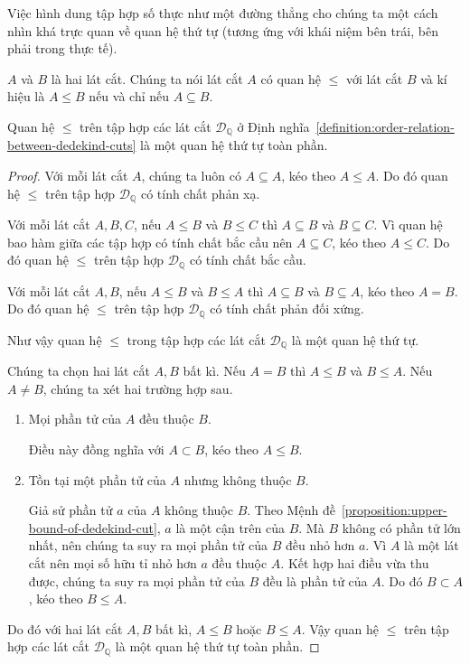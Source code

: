 Việc hình dung tập hợp số thực như một đường thẳng cho chúng ta một cách nhìn khá trực quan về quan hệ thứ tự (tương ứng với khái niệm bên trái, bên phải trong thực tế).

\begin{definition}\label{definition:order-relation-between-dedekind-cuts}
    $A$ và $B$ là hai lát cắt. Chúng ta nói lát cắt $A$ có quan hệ $\leq$ với lát cắt $B$ và kí hiệu là $A\leq B$ nếu và chỉ nếu $A\subseteq B$.
\end{definition}

\begin{theorem}
    Quan hệ $\leq$ trên tập hợp các lát cắt $\mathscr{D}_{\mathbb{Q}}$ ở Định nghĩa~\ref{definition:order-relation-between-dedekind-cuts} là một quan hệ thứ tự toàn phần.
\end{theorem}

\begin{proof}
    Với mỗi lát cắt $A$, chúng ta luôn có $A\subseteq A$, kéo theo $A\leq A$. Do đó quan hệ $\leq$ trên tập hợp $\mathscr{D}_{\mathbb{Q}}$ có tính chất phản xạ.

    Với mỗi lát cắt $A, B, C$, nếu $A\leq B$ và $B\leq C$ thì $A\subseteq B$ và $B\subseteq C$. Vì quan hệ bao hàm giữa các tập hợp có tính chất bắc cầu nên $A\subseteq C$, kéo theo $A\leq C$. Do đó quan hệ $\leq$ trên tập hợp $\mathscr{D}_{\mathbb{Q}}$ có tính chất bắc cầu.

    Với mỗi lát cắt $A, B$, nếu $A\leq B$ và $B\leq A$ thì $A\subseteq B$ và $B\subseteq A$, kéo theo $A = B$. Do đó quan hệ $\leq$ trên tập hợp $\mathscr{D}_{\mathbb{Q}}$ có tính chất phản đối xứng.

    Như vậy quan hệ $\leq$ trong tập hợp các lát cắt $\mathscr{D}_{\mathbb{Q}}$ là một quan hệ thứ tự.

    \bigskip

    Chúng ta chọn hai lát cắt $A, B$ bất kì. Nếu $A = B$ thì $A\leq B$ và $B\leq A$. Nếu $A\ne B$, chúng ta xét hai trường hợp sau.
    \begin{enumerate}[label={\textbf{Trường hợp \arabic*.}},itemindent=2cm]
        \item Mọi phần tử của $A$ đều thuộc $B$.

              Điều này đồng nghĩa với $A\subset B$, kéo theo $A\leq B$.
        \item Tồn tại một phần tử của $A$ nhưng không thuộc $B$.

              Giả sử phần tử $a$ của $A$ không thuộc $B$. Theo Mệnh đề~\ref{proposition:upper-bound-of-dedekind-cut}, $a$ là một cận trên của $B$. Mà $B$ không có phần tử lớn nhất, nên chúng ta suy ra mọi phần tử của $B$ đều nhỏ hơn $a$. Vì $A$ là một lát cắt nên mọi số hữu tỉ nhỏ hơn $a$ đều thuộc $A$. Kết hợp hai điều vừa thu được, chúng ta suy ra mọi phần tử của $B$ đều là phần tử của $A$. Do đó $B\subset A$, kéo theo $B\leq A$.
    \end{enumerate}

    Do đó với hai lát cắt $A, B$ bất kì, $A\leq B$ hoặc $B\leq A$. Vậy quan hệ $\leq$ trên tập hợp các lát cắt $\mathscr{D}_{\mathbb{Q}}$ là một quan hệ thứ tự toàn phần.
\end{proof}

